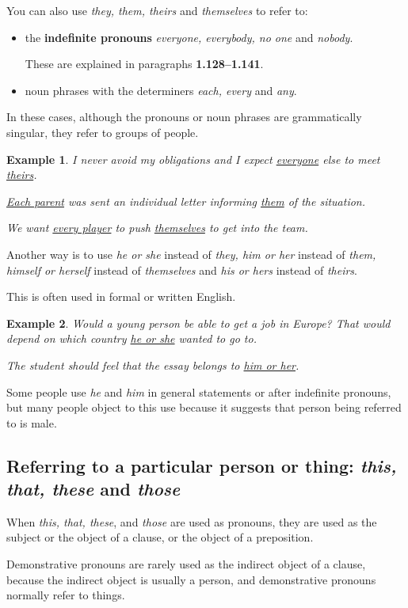 \documentclass[oneside]{book}
\numberwithin{equation}{section}
\newtheorem{example}{Example}[section]
\begin{document}
%
You can also use \textit{they, them, theirs} and \textit{themselves} to refer to:
\begin{itemize}
    \item the \textbf{indefinite pronouns} \textit{everyone, everybody, no one} and \textit{nobody}.
    
    These are explained in paragraphs \textbf{1.128--1.141}.
    \item noun phrases with the determiners \textit{each, every} and \textit{any}.
\end{itemize}
In these cases, although the pronouns or noun phrases are grammatically singular, they refer to groups of people.
\begin{example}
    I never avoid my obligations and I expect \underline{everyone} else to meet \underline{theirs}.
    
    \underline{Each parent} was sent an individual letter informing \underline{them} of the situation.
    
    We want \underline{every player} to push \underline{themselves} to get into the team.
\end{example}
Another way is to use \textit{he or she} instead of \textit{they, him or her} instead of \textit{them, himself or herself} instead of \textit{themselves} and \textit{his or hers} instead of \textit{theirs}.

This is often used in formal or written English.
\begin{example}
    Would a young person be able to get a job in Europe? That would depend on which country \underline{he or she} wanted to go to.
    
    The student should feel that the essay belongs to \underline{him or her}.
\end{example}
Some people use \textit{he} and \textit{him} in general statements or after indefinite pronouns, but many people object to this use because it suggests that person being referred to is male.

\subsection{Referring to a particular person or thing: \textit{this, that, these} and \textit{those}}
\noindent{} When \textit{this, that, these}, and \textit{those} are used as pronouns, they are used as the subject or the object of a clause, or the object of a preposition.

%
Demonstrative pronouns are rarely used as the indirect object of a clause, because the indirect object is usually a person, and demonstrative pronouns normally refer to things.
\end{document}
